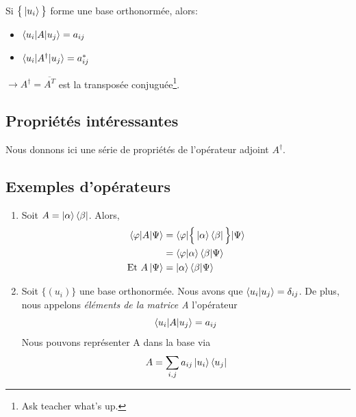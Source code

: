 \documentclass[../notesdecours.tex]{subfiles}
\begin{document}
Si $\big\{\ket{u_i}\big\}$ forme une base orthonormée, alors:
\begin{itemize}
\item $\braket{u_i|A|u_j} = a_{ij}$
\item $\braket{u_i|A^\dag|u_j} = a^*_{ij}$
\end{itemize}
$\rightarrow A^\dag = \overline{A^T}$ est la transposée conjuguée\footnote{Ask teacher what's up.}.\\
\subsection{Propriétés intéressantes}
Nous donnons ici une série de propriétés de l'opérateur adjoint $A^\dag$.
\begin{center}
\end{center}

\subsection{Exemples d'opérateurs}
\begin{enumerate}
\item Soit $A=\ket{\alpha}\bra{\beta}$. Alors,
\begin{align}
\braket{\varphi|A|\Psi} &= \braket{\varphi|\Big\{\ket{\alpha}\bra{\beta}\Big\}|\Psi}\\
&= \braket{\varphi|\alpha}\braket{\beta|\Psi}\\
\text{Et } A\ket{\Psi} &= \ket{\alpha}\braket{\beta|\Psi}
\end{align}
\item Soit $\Big\{(u_i)\Big\}$ une base orthonormée. Nous avons que $\braket{u_i|u_j} = \delta_{ij}$. De plus, nous appelons \emph{éléments de la matrice A} l'opérateur
\begin{equation}
\braket{u_i|A|u_j} = a_{ij}
\end{equation}
Nous pouvons représenter A dans la base via
\begin{equation}
A = \sum_{i,j} a_{ij} \ket{u_i}\bra{u_j}
\end{equation}
\end{enumerate}
\end{document}
